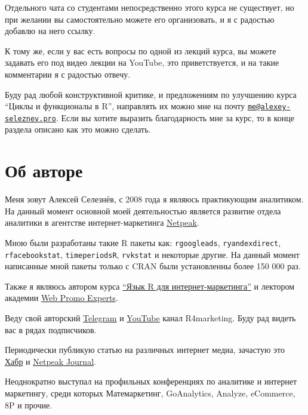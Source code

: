 \documentclass[
]{book}
\begin{document}
Отдельного чата со студентами непосредственно этого курса не существует, но при желании вы самостоятельно можете его организовать, и я с радостью добавлю на него ссылку.

К тому же, если у вас есть вопросы по одной из лекций курса, вы можете задавать его под видео лекции на YouTube, это приветствуется, и на такие комментарии я с радостью отвечу.

Буду рад любой конструктивной критике, и предложениям по улучшению курса ``Циклы и функционалы в R'', направлять их можно мне на почту \href{mailto:me@alexey-seleznev.pro}{\nolinkurl{me@alexey-seleznev.pro}}. Если вы хотите выразить благодарность мне за курс, то в конце раздела описано как это можно сделать.

\hypertarget{ux43eux431-ux430ux432ux442ux43eux440ux435}{%
\section*{Об авторе}\label{ux43eux431-ux430ux432ux442ux43eux440ux435}}

Меня зовут Алексей Селезнёв, с 2008 года я являюсь практикующим аналитиком. На данный момент основной моей деятельностью является развитие отдела аналитики в агентстве интернет-маркетинга \href{https://https://netpeak.group/}{Netpeak}.

Мною были разработаны такие R пакеты как: \texttt{rgoogleads}, \texttt{ryandexdirect}, \texttt{rfacebookstat}, \texttt{timeperiodsR}, \texttt{rvkstat} и некоторые другие. На данный момент написанные мной пакеты только с CRAN были установленны более 150 000 раз.

Также я являюсь автором курса \href{https://needfordata.ru/r}{``Язык R для интернет-маркетинга''} и лектором академии \href{https://webpromoexperts.net/}{Web Promo Experts}.

Веду свой авторский \href{https://t.me/R4marketing}{Telegram} и \href{https://www.youtube.com/R4marketing/?sub_confirmation=1}{YouTube} канал R4marketing. Буду рад видеть вас в рядах подписчиков.

Периодически публикую статью на различных интернет медиа, зачастую это \href{https://habr.com/ru/users/selesnow/}{Хабр} и \href{https://netpeak.net/ru/blog/user/publication/826/}{Netpeak Journal}.

Неоднократно выступал на профильных конференциях по аналитике и интернет маркетингу, среди которых Матемаркетинг, GoAnalytics, Analyze, eCommerce, 8P и прочие.
\end{document}

